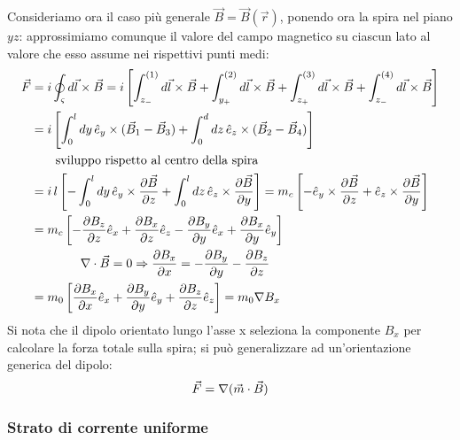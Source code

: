 \documentclass[]{article}
\begin{document}
Consideriamo ora il caso più generale $ \vec{B} = \vec{B}(\vec{r}) $, ponendo ora la spira nel piano $ yz $: approssimiamo comunque il valore del campo magnetico su ciascun lato al valore che esso assume nei rispettivi punti medi:
\begin{equation}
	\begin{split}
		\vec{F} &= i\oint_{\varsigma} d\vec{l}\times\vec{B} = i \left[ \int_{z_-}^{(1)} d\vec{l}\times\vec{B} + \int_{y_+}^{(2)} d\vec{l}\times\vec{B} + \int_{z_+}^{(3)} d\vec{l}\times\vec{B} + \int_{z_-}^{(4)} d\vec{l}\times\vec{B} \right] \\ 
			&= i \left[ \int_0^l dy \, \hat{e}_y \times (\vec{B}_1 - \vec{B}_3) + \int_0^d dz \, \hat{e}_z \times (\vec{B}_2 - \vec{B}_4) \right] \\ 
			& \qquad \text{sviluppo rispetto al centro della spira} \\
			&= i\,l\left[ - \int_0^l dy\, \hat{e}_y \times \displaystyle\frac{\partial\vec{B}}{\partial z} + \int_0^l dz\, \hat{e}_z \times \displaystyle\frac{\partial\vec{B}}{\partial y} \right] = m_c \left[ - \hat{e}_y \times \displaystyle\frac{\partial\vec{B}}{\partial z} + \hat{e}_z \times \displaystyle\frac{\partial\vec{B}}{\partial y} \right] \\ 
			&= m_c \left[ - \displaystyle\frac{\partial B_z}{\partial z} \hat{e}_x + \displaystyle\frac{\partial B_x}{\partial z} \hat{e}_z - \displaystyle\frac{\partial B_y}{\partial y} \hat{e}_x + \displaystyle\frac{\partial B_x}{\partial y} \hat{e}_y \right] \\ 
			& \qquad\qquad \nabla\cdot\vec{B} = 0 \Rightarrow \displaystyle\frac{\partial B_x}{\partial x} = - \displaystyle\frac{\partial B_y}{\partial y} - \displaystyle\frac{\partial B_z}{\partial z} \\ 
			&= m_0 \left[ \displaystyle\frac{\partial B_x}{\partial x} \hat{e}_x + \displaystyle\frac{\partial B_y}{\partial y} \hat{e}_y + \displaystyle\frac{\partial B_z}{\partial z} \hat{e}_z \right] = m_0 \nabla B_x
	\end{split}
	\label{eq:}
\end{equation}
Si nota che il dipolo orientato lungo l'asse x seleziona la componente $ B_x $ per calcolare la forza totale sulla spira; si può generalizzare ad un'orientazione generica del dipolo:
\begin{equation}
	\vec{F} = \nabla(\vec{m}\cdot\vec{B})
	\label{eq:for-sp-non-uni}
\end{equation}

\subsubsection{Strato di corrente uniforme}
\end{document}
